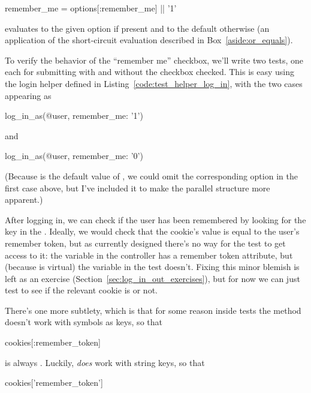 \begin{code}
remember_me = options[:remember_me] || '1'
\end{code}

\noindent evaluates to the given option if present and to the default otherwise (an application of the short-circuit evaluation described in Box~\ref{aside:or_equals}).

To verify the behavior of the ``remember me'' checkbox, we'll write two tests, one each for submitting with and without the checkbox checked. This is easy using the login helper defined in Listing~\ref{code:test_helper_log_in}, with the two cases appearing as

\begin{code}
log_in_as(@user, remember_me: '1')
\end{code}

\noindent and

\begin{code}
log_in_as(@user, remember_me: '0')
\end{code}

\noindent (Because  is the default value of , we could omit the corresponding option in the first case above, but I've included it to make the parallel structure more apparent.)

After logging in, we can check if the user has been remembered by looking for the  key in the . Ideally, we would check that the cookie's value is equal to the user's remember token, but as currently designed there's no way for the test to get access to it: the  variable in the controller has a remember token attribute, but (because  is virtual) the  variable in the test doesn't. Fixing this minor blemish is left as an exercise (Section~\ref{sec:log_in_out_exercises}), but for now we can just test to see if the relevant cookie is  or not.

There's one more subtlety, which is that for some reason inside tests the  method doesn't work with symbols as keys, so that

\begin{code}
cookies[:remember_token]
\end{code}

\noindent is always . Luckily,  \emph{does} work with string keys, so that

\begin{code}
cookies['remember_token']
\end{code}

